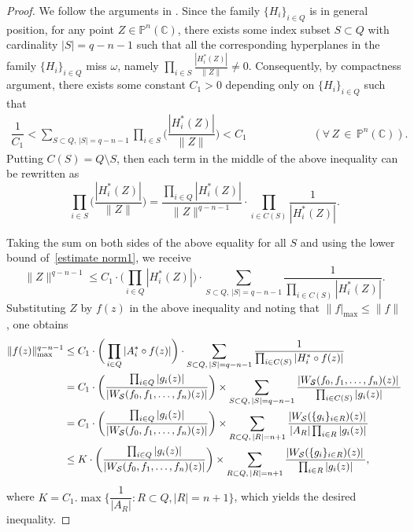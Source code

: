 \documentclass[english, 12pt]{amsart}
\theoremstyle{plain}
\theoremstyle{remark}
\numberwithin{equation}{section}
\theoremstyle{plain}
\theoremstyle{named}
\begin{document}
\begin{proof} We follow the arguments in \cite[page~125, Lemma 4.2.3]{Noguchi-Winkelmann2014}.
Since  the family $\{H_i\}_{i\in Q}$ is in general position, for any point $Z\in \mathbb{P}^{n}(\mathbb{C})$,  there exists some index subset $S\subset Q$ with cardinality $|S|=q-n-1$ such that all the corresponding hyperplanes in the family $\{H_i\}_{i\in Q}$ miss $\omega$, namely
$\prod_{i\in S}\frac{|H_i^*(Z)|}{\|Z\|}\not=0		$. Consequently, by compactness argument, there exists some constant $C_1>0$ depending only on $\{H_i\}_{i\in Q}$ such that
\begin{align}
\label{estimate norm1}
\dfrac{1}{C_1}
<
\sum_{S\subset Q,\,|S|=q-n-1}
\prod_{i\in S}\bigg(\dfrac{|H_i^*(Z)|}{\|Z\|}\bigg)
<
C_1
\qquad\qquad\qquad
\scriptstyle{(\forall\,Z\,\in\,\mathbb{P}^{n}(\mathbb{C})).}
\end{align}
Putting $C(S)=Q\setminus S$, then each term in the middle of the above inequality can be rewritten as
\begin{equation}
\label{rewrite 1}
\prod_{i\in S}\bigg(\dfrac{|H_i^*(Z)|}{\|Z\|}\bigg)
=
\dfrac{\prod_{i\in Q}|H_i^*(Z)|}{\|Z\|^{q-n-1}}
\cdot
\prod_{i\in C(S)}\dfrac{1}{|H_i^*(Z)|}.
\end{equation}

Taking the sum on both sides of the above equality for all $S$ and using the lower bound of~\eqref{estimate norm1}, we receive
\[
\|Z\|^{q-n-1}
\leq
C_1
\cdot
\bigg(\prod_{i\in Q}|H_i^*(Z)|\bigg)
\cdot
\sum_{S\subset Q,\,|S|=q-n-1}
\dfrac{1}{\prod_{i\in C(S)}|H_i^*(Z)|}.
\]
Substituting $Z$ by $f(z)$ in the above inequality and noting that $\|f|_{\max}\leq \|f\|$, one obtains
\begin{align}
\|f(z)\|_{\max}^{q-n-1}
&\leq
C_1
\cdot
\bigg(\prod_{i\in Q}|A_i^*\circ f(z)|\bigg)
\cdot
\sum_{S\subset Q,\,|S|=q-n-1}
\dfrac{1}{\prod_{i\in C(S)}|H_i^*\circ f(z)|}\notag\\
&=
C_1
\cdot
\bigg(
\dfrac{\prod_{i\in Q}|g_i(z)|}{|W_{\mathcal{S}}(f_0,f_1,\dots,f_n)(z)|}
\bigg)\times\sum_{S\subset Q,\,|S|=q-n-1}
\dfrac{|W_{\mathcal{S}}(f_0,f_1,\dots,f_n)(z)|\,
}{\prod_{i\in C(S)}|g_i(z)|}\notag\\
&=
C_1
\cdot
\bigg(
\dfrac{\prod_{i\in Q}|g_i(z)|}{|W_{\mathcal{S}}(f_0,f_1,\dots,f_n)(z)|}
\bigg)\times
\sum_{R\subset Q,\,|R|=n+1}
\dfrac{|W_{\mathcal{S}}(\{g_i\}_{i\in R})(z)|\,
}{|A_R|\prod_{i\in R}|g_i(z)|}\notag\\
&\leq
K
\cdot
\bigg(
\dfrac{\prod_{i\in Q}|g_i(z)|}{|W_{\mathcal{S}}(f_0,f_1,\dots,f_n)(z)|}
\bigg)\times
\sum_{R\subset Q,\,|R|=n+1}
\dfrac{|W_{\mathcal{S}}(\{g_i\}_{i\in R})(z)|\,
}{\prod_{i\in R}|g_i(z)|},\notag
\end{align}
where $K=C_1.\max\{\dfrac{1}{|A_R|}: R\subset Q, |R|=n+1\}$, which yields the desired inequality.
\end{proof}
	
\end{document}
